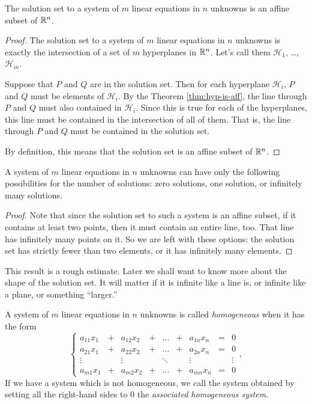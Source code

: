\documentclass[elementsmain.tex]{subfiles}
\begin{document}
\begin{theorem}
The solution set to a system of $m$ linear equations in $n$ unknowns is an affine subset of $\mathbb{R}^n$.
\end{theorem}

\begin{proof}
The solution set to a system of $m$ linear equations in $n$ unknowns is exactly the intersection of a set of $m$ hyperplanes in $\mathbb{R}^n$. Let's call them $\mathcal{H}_1$, \dots, $\mathcal{H}_m$. 

Suppose that $P$ and $Q$ are in the solution set. Then for each hyperplane $\mathcal{H}_i$, $P$ and $Q$ must be elements of $\mathcal{H}_i$. By the Theorem \ref{thm:hyp-is-aff}, the line through $P$ and $Q$ must also contained in $\mathcal{H}_i$.  Since this is true for each of the hyperplanes, this line must be contained in the intersection of all of them. That is, the line through $P$ and $Q$ must be contained in the solution set.

By definition, this means that the solution set is an affine subset of $\mathbb{R}^n$.
\end{proof}


\begin{corollary}
A system of $m$ linear equations in $n$ unknowns can have only the following possibilities for the number of solutions: zero solutions, one solution, or infinitely many solutions.
\end{corollary}

\begin{proof}
Note that since the solution set to such a system is an affine subset, if it contains at least two points, then it must contain an entire line, too. That line has infinitely many points on it. So we are left with these options: the solution set has strictly fewer than two elements, or it has infinitely many elements.
\end{proof}

This result is a rough estimate. Later we shall want to know more about the shape of the solution set. It will matter if it is infinite like a line is, or infinite like a plane, or something ``larger.''


\begin{definition} A system of $m$ linear equations in $n$ unknowns is called \emph{homogeneous} when it has the form
\begin{equation*}
\left\{
\begin{array}{ccccccccc}
a_{11} x_1 & + & a_{12} x_2 & + & \dots & + & a_{1n} x_n & = & 0 \\
a_{21} x_1 & + & a_{22} x_2 & + & \dots & + & a_{2n} x_n & = & 0 \\
\vdots     &   & \vdots     &   & \ddots &  & \vdots     &  & \vdots \\ 
a_{m1} x_1 & + & a_{m2} x_2 & + & \dots & + & a_{mn} x_n & = & 0 
\end{array}\right.,
\end{equation*}
If we have a system which is not homogeneous, we call the system obtained by setting all the right-hand sides to $0$ the \emph{associated homogeneous system}.
\end{definition}
\end{document}

